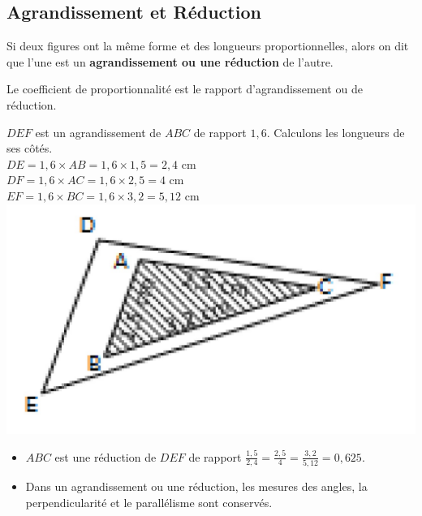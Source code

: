 \documentclass[openany]{book}
\begin{document}
\subsection{Agrandissement et Réduction}

\begin{Def}
Si	deux figures ont la même forme et des longueurs proportionnelles, 
alors	on dit que l'une est un \textbf{agrandissement ou une réduction} de l'autre.
\end{Def}

\begin{Rq}
Le coefficient de proportionnalité est le rapport d'agrandissement ou de réduction.
\end{Rq}

\begin{Ex}
\begin{multicols}{2}
$DEF$ est un agrandissement de $ABC$ de rapport $1,6$. Calculons les longueurs de ses côtés.
\\$DE = 1,6 \times AB = 1,6 \times 1,5 = 2,4$ cm
\\$DF = 1,6 \times AC = 1,6 \times 2,5 = 4$ cm
\\$EF = 1,6 \times BC = 1,6 \times 3,2 = 5,12$ cm
\\\includegraphics[scale=0.25]{cours2.jpg}  
\end{multicols}
\end{Ex}

\begin{Rq} 
\begin{itemize}
\item $ABC$ est une réduction de $DEF$ de rapport $\frac{1,5}{2,4}  = \frac{2,5}{4} =\frac{3,2}{5,12}  = 0,625$.
\item Dans un agrandissement ou une réduction, les mesures des angles, la perpendicularité 
et le parallélisme sont conservés.
\end{itemize}
\end{Rq}
\end{document}
